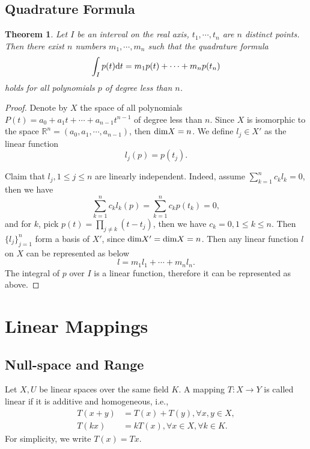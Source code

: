 \documentclass[10pt]{book}
\newtheorem{theorem}{Theorem}[chapter]
\theoremstyle{definition}
\numberwithin{equation}{chapter}
\begin{document}
\section{Quadrature Formula}
\begin{theorem}
Let $I$ be an interval on the real axis, $t_1, \cdots, t_n$ are $n$ distinct points. Then there exist $n$ numbers $m_1,\cdots,m_n$ such that the quadrature formula
\begin{align*}
    \int_I p(t) {\rm d}t = m_1 p(t) + \cdots + m_n p(t_n)
\end{align*}
holds for all polynomials $p$ of degree less than $n$.
\end{theorem}
\begin{proof}
Denote by $X$ the space of all polynomials $P(t) = a_0 + a_1 t +\cdots+ a_{n-1}t^{n-1}$ of degree less than $n$. Since $X$ is isomorphic to the space $\mathbb{R}^n = (a_0,a_1,\cdots,a_{n-1})$, then ${\rm dim}X = n$. We define $l_j\in X'$ as the linear function 
$$l_j(p) = p(t_j).$$

Claim that $l_j, 1\leq j \leq n$ are linearly independent. Indeed, assume $\sum^n_{k=1}c_k l_k = 0$, then we have 
$$\sum^n_{k=1}c_k l_k(p) = \sum^n_{k=1}c_k p(t_k) = 0,$$
and for $k$, pick $p(t) = \prod_{j\neq k}(t - t_j)$, then we have $c_k = 0, 1\leq k\leq n$. Then $\{l_j\}^n_{j=1}$ form a basis of $X'$, since ${\rm dim}X' = {\rm dim}X = n$. Then any linear function $l$ on $X$ can be represented as below
$$l = m_1 l_1 + \cdots + m_n l_n.$$
The integral of $p$ over $I$ is a linear function, therefore it can be represented as above.
\end{proof}


\medskip

\chapter{Linear Mappings}
\section{Null-space and Range}

Let $X,U$ be linear spaces over the same field $K$. A mapping $T:X\to Y$ is called linear if it is additive and homogeneous, i.e.,
\begin{align*}
    T(x+y) &= T(x)+T(y), \forall x,y \in X,\\
    T(k x) &= k T(x), \forall x\in X, \forall k\in K.
\end{align*}
For simplicity, we write $T(x) = T x$.
\end{document}
